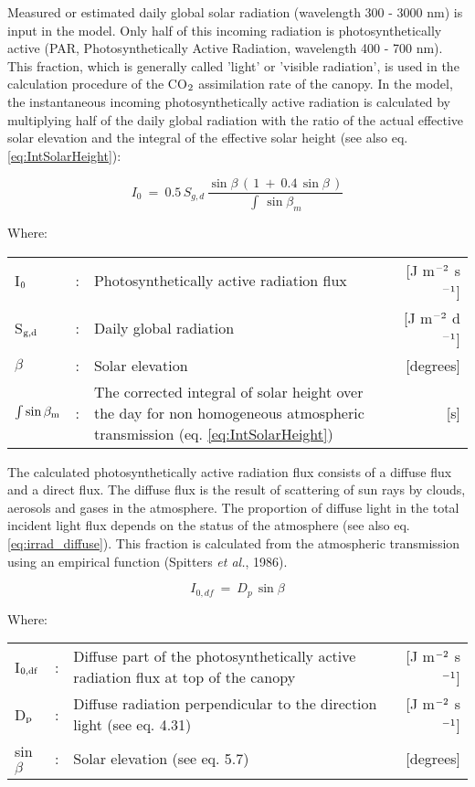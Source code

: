 Measured or estimated daily global solar radiation  (wavelength 300 - 3000 nm) is input
in the model. Only half of this incoming radiation is photosynthetically active (PAR,
Photosynthetically Active Radiation, wavelength 400 - 700 nm). This fraction, which is
generally called 'light' or 'visible radiation', is used in the calculation procedure of the
CO$_{{\rm 2}}$ assimilation rate of the canopy. In the model, the instantaneous incoming 
photosynthetically active radiation is calculated by multiplying half of the daily global radiation
with the ratio of the actual effective solar elevation and the integral of the effective solar
height (see also eq. \ref{eq:IntSolarHeight}):

\begin{equation}
I _{0} ~=~ 0.5\, S _{g,d} \,{\frac{\sin \beta \, (\, 1~+~0.4\, \sin \beta \, )}{\int \, \sin \beta _{m} }}
\end{equation}

Where:\\[5pt]
\begin{tabularx}{\textwidth}{llXr}
I$_{{\rm 0}}$ &:& Photosynthetically active radiation flux    &    
    [J m$^{{\rm -2}}$ s$^{{\rm -1}}$]\\
S$_{{\rm g,d}}$ &:& Daily global radiation   &     
    [J m$^{{\rm -2}}$ d$^{{\rm -1}}$] \\
$\beta$ &:& Solar elevation    &    [degrees]\\
$\int \sin \beta_{{\rm m}}$ &:& The corrected integral of solar height over the day 
    for non homogeneous atmospheric transmission (eq. \ref{eq:IntSolarHeight})   
    &     [s]\\
\end{tabularx}

The calculated photosynthetically active radiation flux consists of a diffuse flux and a
direct flux. The diffuse flux is the result of scattering of sun rays by clouds, aerosols and
gases in the atmosphere. The proportion of diffuse light in the total incident light flux
depends on the status of the atmosphere (see also eq. \ref{eq:irrad_diffuse}). This fraction 
is calculated from the atmospheric transmission using an empirical function (Spitters 
{\it et al.}, 1986).

\begin{equation}
I_{0,df} ~=~ D _{p~} \sin \beta
\end{equation}

Where:\\[5pt]
\begin{tabularx}{\textwidth}{llXr}
I$_{{\rm 0,df}}$ &:& Diffuse part of the photosynthetically active radiation flux 
   at top of the canopy    &    [J m$^{{\rm -2}}$ s$^{{\rm -1}}$]\\
D$_{{\rm p}}$ &:& Diffuse radiation perpendicular to the direction 
   light (see eq. 4.31)    &    [J m$^{{\rm -2}}$ s$^{{\rm -1}}$]\\
sin$\beta$ &:& Solar elevation (see eq. 5.7)    &    [degrees]\\
\end{tabularx}

